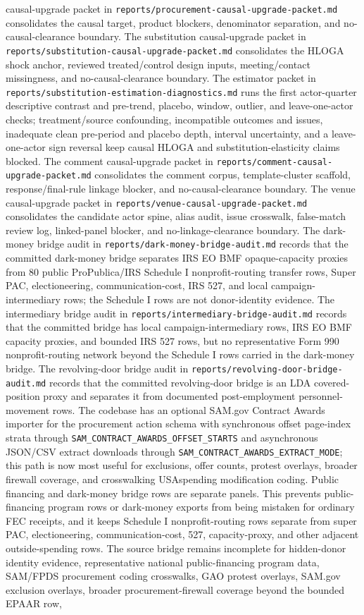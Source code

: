 causal-upgrade packet in \texttt{reports/procurement-causal-upgrade-packet.md} consolidates the causal target, product blockers, denominator separation, and no-causal-clearance boundary. The substitution causal-upgrade packet in \texttt{reports/substitution-causal-upgrade-packet.md} consolidates the HLOGA shock anchor, reviewed treated/control design inputs, meeting/contact missingness, and no-causal-clearance boundary. The estimator packet in \texttt{reports/substitution-estimation-diagnostics.md} runs the first actor-quarter descriptive contrast and pre-trend, placebo, window, outlier, and leave-one-actor checks; treatment/source confounding, incompatible outcomes and issues, inadequate clean pre-period and placebo depth, interval uncertainty, and a leave-one-actor sign reversal keep causal HLOGA and substitution-elasticity claims blocked. The comment causal-upgrade packet in \texttt{reports/comment-causal-upgrade-packet.md} consolidates the comment corpus, template-cluster scaffold, response/final-rule linkage blocker, and no-causal-clearance boundary. The venue causal-upgrade packet in \texttt{reports/venue-causal-upgrade-packet.md} consolidates the candidate actor spine, alias audit, issue crosswalk, false-match review log, linked-panel blocker, and no-linkage-clearance boundary. The dark-money bridge audit in \texttt{reports/dark-money-bridge-audit.md} records that the committed dark-money bridge separates IRS EO BMF opaque-capacity proxies from 80 public ProPublica/IRS Schedule I nonprofit-routing transfer rows, Super PAC, electioneering, communication-cost, IRS 527, and local campaign-intermediary rows; the Schedule I rows are not donor-identity evidence. The intermediary bridge audit in \texttt{reports/intermediary-bridge-audit.md} records that the committed bridge has local campaign-intermediary rows, IRS EO BMF capacity proxies, and bounded IRS 527 rows, but no representative Form 990 nonprofit-routing network beyond the Schedule I rows carried in the dark-money bridge. The revolving-door bridge audit in \texttt{reports/revolving-door-bridge-audit.md} records that the committed revolving-door bridge is an LDA covered-position proxy and separates it from documented post-employment personnel-movement rows. The codebase has an optional SAM.gov Contract Awards importer for the procurement action schema with synchronous offset page-index strata through \texttt{SAM\_CONTRACT\_AWARDS\_OFFSET\_STARTS} and asynchronous JSON/CSV extract downloads through \texttt{SAM\_CONTRACT\_AWARDS\_EXTRACT\_MODE}; this path is now most useful for exclusions, offer counts, protest overlays, broader firewall coverage, and crosswalking USAspending modification coding. Public financing and dark-money bridge rows are separate panels. This prevents public-financing program rows or dark-money exports from being mistaken for ordinary FEC receipts, and it keeps Schedule I nonprofit-routing rows separate from super PAC, electioneering, communication-cost, 527, capacity-proxy, and other adjacent outside-spending rows. The source bridge remains incomplete for hidden-donor identity evidence, representative national public-financing program data, SAM/FPDS procurement coding crosswalks, GAO protest overlays, SAM.gov exclusion overlays, broader procurement-firewall coverage beyond the bounded EPAAR row, 